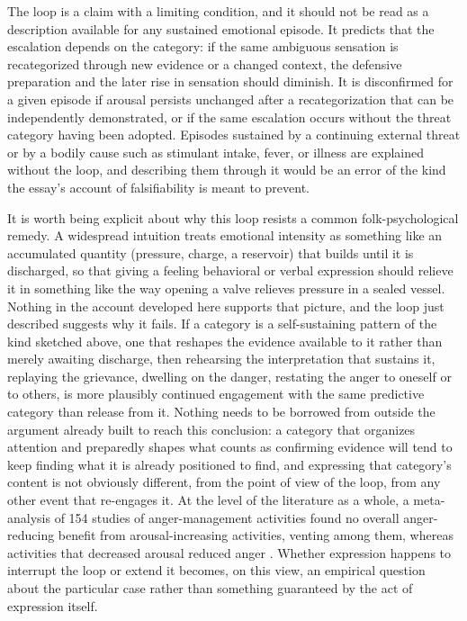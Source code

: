 \documentclass[11pt]{article}
\begin{document}
The loop is a claim with a limiting condition, and it should not be read as a description available for any sustained emotional episode. It predicts that the escalation depends on the category: if the same ambiguous sensation is recategorized through new evidence or a changed context, the defensive preparation and the later rise in sensation should diminish. It is disconfirmed for a given episode if arousal persists unchanged after a recategorization that can be independently demonstrated, or if the same escalation occurs without the threat category having been adopted. Episodes sustained by a continuing external threat or by a bodily cause such as stimulant intake, fever, or illness are explained without the loop, and describing them through it would be an error of the kind the essay's account of falsifiability is meant to prevent.

It is worth being explicit about why this loop resists a common folk-psychological remedy. A widespread intuition treats emotional intensity as something like an accumulated quantity (pressure, charge, a reservoir) that builds until it is discharged, so that giving a feeling behavioral or verbal expression should relieve it in something like the way opening a valve relieves pressure in a sealed vessel. Nothing in the account developed here supports that picture, and the loop just described suggests why it fails. If a category is a self-sustaining pattern of the kind sketched above, one that reshapes the evidence available to it rather than merely awaiting discharge, then rehearsing the interpretation that sustains it, replaying the grievance, dwelling on the danger, restating the anger to oneself or to others, is more plausibly continued engagement with the same predictive category than release from it. Nothing needs to be borrowed from outside the argument already built to reach this conclusion: a category that organizes attention and preparedly shapes what counts as confirming evidence will tend to keep finding what it is already positioned to find, and expressing that category's content is not obviously different, from the point of view of the loop, from any other event that re-engages it. At the level of the literature as a whole, a meta-analysis of 154 studies of anger-management activities found no overall anger-reducing benefit from arousal-increasing activities, venting among them, whereas activities that decreased arousal reduced anger \citep{Kjaervik2024}. Whether expression happens to interrupt the loop or extend it becomes, on this view, an empirical question about the particular case rather than something guaranteed by the act of expression itself.
\end{document}

